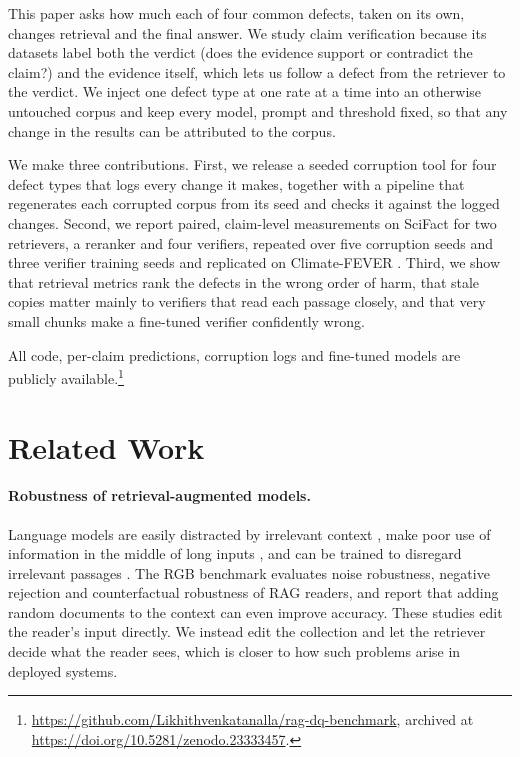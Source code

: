 \documentclass[11pt]{article}
\begin{document}
This paper asks how much each of four common defects, taken on its own, changes retrieval and the final
answer. We study claim verification because its datasets label both the verdict (does the evidence
support or contradict the claim?) and the evidence itself, which lets us follow a defect from the
retriever to the verdict. We inject one defect type at one rate at a time into an otherwise untouched
corpus and keep every model, prompt and threshold fixed, so that any change in the results can be
attributed to the corpus.

We make three contributions. First, we release a seeded corruption tool for four defect types that logs
every change it makes, together with a pipeline that regenerates each corrupted corpus from its seed and
checks it against the logged changes. Second, we report paired, claim-level measurements on SciFact
\citep{wadden2020scifact} for two retrievers, a reranker and four verifiers, repeated over five corruption
seeds and three verifier training seeds and replicated on Climate-FEVER \citep{diggelmann2020climatefever}.
Third, we show that retrieval metrics rank the defects in the wrong order of harm, that stale copies matter
mainly to verifiers that read each passage closely, and that very small chunks make a fine-tuned verifier
confidently wrong.

All code, per-claim predictions, corruption logs and fine-tuned models are publicly
available.\footnote{\url{https://github.com/Likhithvenkatanalla/rag-dq-benchmark}, archived at
\url{https://doi.org/10.5281/zenodo.23333457}.}

\section{Related Work}

\paragraph{Robustness of retrieval-augmented models.}
Language models are easily distracted by irrelevant context \citep{shi2023distracted}, make poor use of
information in the middle of long inputs \citep{liu2024lost}, and can be trained to disregard irrelevant
passages \citep{yoran2024robust}. The RGB benchmark \citep{chen2024rgb} evaluates noise robustness,
negative rejection and counterfactual robustness of RAG readers, and \citet{cuconasu2024noise} report that
adding random documents to the context can even improve accuracy. These studies edit the reader's input
directly. We instead edit the collection and let the retriever decide what the reader sees, which is closer
to how such problems arise in deployed systems.
\end{document}
